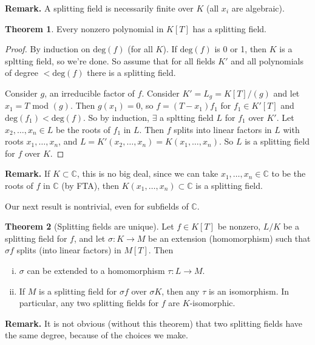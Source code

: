 \documentclass{article}
\theoremstyle{definition}
\newtheorem{theorem}{Theorem}[section]
\begin{document}
\textbf{Remark.} A splitting field is necessarily finite over $K$ (all $x_i$ are algebraic).
\begin{theorem}\label{6.6}
    Every nonzero polynomial in $K[T]$ has a splitting field.
\end{theorem}
\begin{proof}
    By induction on $\text{deg}(f)$ (for all $K$). If $\text{deg}(f)$ is 0 or 1, then $K$ is a spltting field, so we're done. So assume that for all fields $K'$ and all polynomials of degree $<\text{deg}(f)$ there is a splitting field.
    \vspace{1mm}

    Consider $g$, an irreducible factor of $f$. Consider $K' = L_g = K[T]/(g)$ and let $x_1 = T$ mod $(g)$. Then $g(x_1)=0$, so $f = (T-x_1)f_1$ for $f_1 \in K'[T]$ and $\text{deg}(f_1)<\text{deg}(f)$. So by induction, $\exists$ a spltting field $L$ for $f_1$ over $K'$. Let $x_2,\ldots,x_n \in L$ be the roots of $f_1$ in $L$. Then $f$ splits into linear factors in $L$ with roots $x_1,\ldots,x_n$, and $L=K'(x_2,\ldots,x_n) = K(x_1,\ldots,x_n)$. So $L$ is a splitting field for $f$ over $K$.
\end{proof}


\vspace{1mm}

\textbf{Remark.} If $K \subset \mathbb{C}$, this is no big deal, since we can take $x_1,\ldots,x_n \in \mathbb{C}$ to be the roots of $f$ in $\mathbb{C}$ (by FTA), then $K(x_1,\ldots,x_n) \subset \mathbb{C}$ is a splitting field.
\vspace{1mm}

Our next result is nontrivial, even for subfields of $\mathbb{C}$.
\begin{theorem}[Splitting fields are unique]
    Let $f \in K[T]$ be nonzero, $L/K$ be a splitting field for $f$, and let $\sigma : K \to M$ be an extension (homomorphism) such that $\sigma f$ splits (into linear factors) in $M[T]$. Then
    \begin{enumerate}[(i)]
        \item $\sigma$ can be extended to a homomorphism $\tau : L \to M$.
        \item If $M$ is a splitting field for $\sigma f$ over $\sigma K$, then any $\tau$ is an isomorphism. In particular, any two splitting fields for $f$ are $K$-isomorphic.
    \end{enumerate}
\end{theorem}
\textbf{Remark.} It is not obvious (without this theorem) that two splitting fields have the same degree, because of the choices we make.
\end{document}

